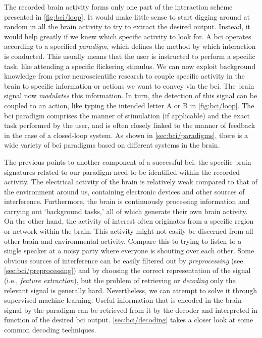 The recorded brain activity forms only one part of the interaction scheme presented in
\autoref{fig:bci/loop}.
It would make little sense to start digging around at random in all the brain activity
to try to extract the desired output.
Instead, it would help greatly if we knew which specific activity to look for.
A \ac{bci} operates according to a specified \emph{paradigm}, which defines the method
by which interaction is conducted.
This usually means that the user is instructed to perform a specific task, like
attending a specific flickering stimulus.
We can now exploit background knowledge from prior neuroscientific research to couple
specific activity in the brain to specific information or actions we want to convey via
the \ac{bci}.
The brain signal now \emph{modulates} this information.
In turn, the detection of this signal can be coupled to an action, like typing the
intended letter A or B in \autoref{fig:bci/loop}.
The \ac{bci} paradigm comprises the manner of stimulation (if applicable) and the exact
task performed by the user, and is often closely linked to the manner of feedback in the
case of a closed-loop system.
As shown in \autoref{sec:bci/paradigms}, there is a wide variety of \ac{bci} paradigms
based on different systems in the brain.

The previous points to another component of a successful \ac{bci}: the specific brain
signatures related to our paradigm need to be identified within the recorded activity.
The electrical activity of the brain is relatively weak compared to that of the
environment around us, containing electronic devices and other sources of interference.
Furthermore, the brain is continuously processing information and carrying out
`background tasks,' all of which generate their own brain activity.
On the other hand, the activity of interest often originates from a specific region or
network within the brain.
This activity might not easily be discerned from all other brain and environmental
activity.
Compare this to trying to listen to a single speaker at a noisy party where everyone is
shouting over each other.
Some obvious sources of interference can be easily filtered out by \emph{preprocessing}
(see \autoref{sec:bci/preprocessing}) and by choosing the correct representation of the
signal (i.e., \emph{feature extraction}), but the problem of retrieving or
\emph{decoding} only the relevant signal is generally hard.
Nevertheless, we can attempt to solve it through supervised machine learning.
Useful information that is encoded in the brain signal by the paradigm can be retrieved
from it by the decoder and interpreted in function of the desired \ac{bci} output.
\autoref{sec:bci/decoding} takes a closer look at some common decoding techniques.


